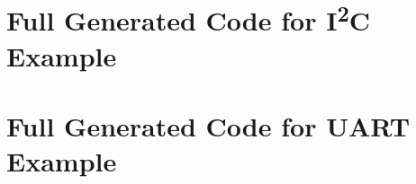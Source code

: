 
%




\chapter{Full Generated Code for I\texorpdfstring{\textsuperscript{2}}{2}C Example}
\label{appendix:i2c}



\chapter{Full Generated Code for UART Example}
\label{appendix:uart}


